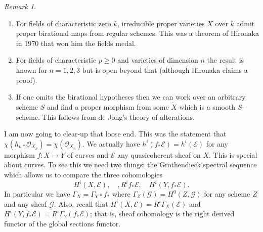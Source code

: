 \documentclass[12pt]{article}
\numberwithin{equation}{section}
\theoremstyle{definition}
\theoremstyle{remark}
\newtheorem{remark}[theorem]{Remark}
\newcommand{\Ocal}{\mathcal{O}}
\newcommand{\Gcal}{\mathcal{G}}
\newcommand{\Ecal}{\mathcal{E}}
\begin{document}
\begin{remark}
	\begin{enumerate}
		\item For fields of characteristic zero $k$, irreducible proper varieties $X$ over $k$ admit proper birational maps from regular schemes. 
		This was a theorem of Hironaka in 1970 that won him the fields medal. 
		\item For fields of characteristic $p\geq 0$ and varieties of dimension $n$ the result is known for $n=1,2,3$ but is open beyond that (although Hironaka claims a proof).
		\item If one omits the birational hypotheses then we can work over an arbitrary scheme $S$ and find a proper morphism from some $\widetilde{X}$ which is a smooth $S$-scheme. This follows from de Jong's theory of alterations.   
	\end{enumerate}
\end{remark}

I am now going to clear-up that loose end. 
This was the statement that $\chi(h_{n*}\Ocal_{X_n}) = \chi(\Ocal_{X_n})$. 
We actually have $h^i(f_*\Ecal) = h^i(\Ecal)$ for any morphism $f:X\to Y$ of curves and $\Ecal$ any quasicoherent sheaf on $X$. 
This is special about curves. 
To see this we need two things: the Grothendieck spectral sequence which allows us to compare the three cohomologies 
$$ H^i(X,\Ecal), \quad, R^if_*\Ecal, \quad H^i(Y,f_*\Ecal). $$
In particular we have $\Gamma_X = \Gamma_Y\circ f_*$ where $\Gamma_Z(\Gcal) = H^0(Z,\Gcal)$ for any scheme $Z$ and any sheaf $\Gcal$.
Also, recall that $H^i(X,\Ecal) = R^i\Gamma_X(\Ecal)$ and $H^i(Y,f_*\Ecal) = R^i\Gamma_Y(f_*\Ecal)$; that is, sheaf cohomology is the right derived functor of the global sections functor.
\end{document}
